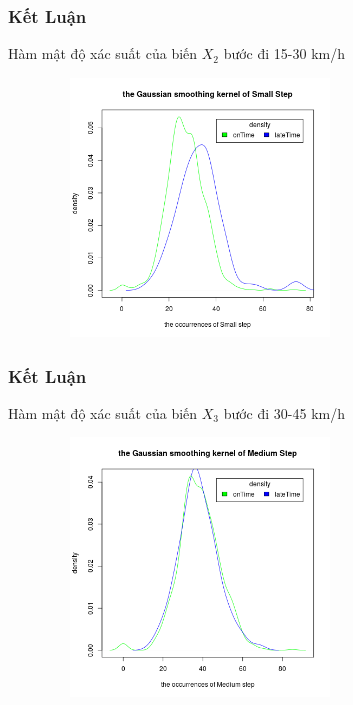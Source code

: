 \documentclass[t]{beamer}
\begin{document}

\begin{frame}
\frametitle{Kết Luận}
Hàm mật độ xác suất của biến $X_2$ bước đi 15-30 km/h
\begin{center}
\includegraphics[height=2.7in,width=4in]{DensitySmallStep.png}
\end{center}
\end{frame}


\begin{frame}
\frametitle{Kết Luận}
Hàm mật độ xác suất của biến $X_3$ bước đi 30-45 km/h
\begin{center}
\includegraphics[height=2.7in,width=4in]{DensityMediumStep.png}
\end{center}
\end{frame}

\end{document}

